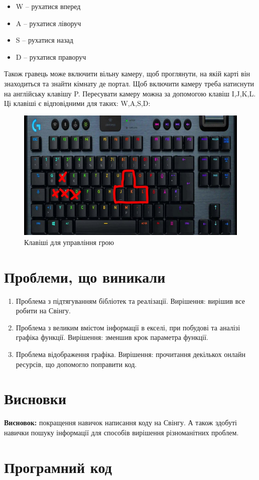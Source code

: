 \documentclass{article}
\begin{document}
\begin{itemize}
	\item W – рухатися вперед
	\item A – рухатися ліворуч
	\item S – рухатися назад
	\item D – рухатися праворуч
\end{itemize}
Також гравець може включити вільну камеру, щоб проглянути, на якій карті
він знаходиться та знайти кімнату де портал. Щоб включити камеру треба
натиснути на англійську клавішу P. Пересувати камеру можна за допомогою
клавіш I,J,K,L. Ці клавіші є відповідними для таких: W,A,S,D:
\begin{figure}[H]
	\centering
	\includegraphics[width=0.9 \textwidth]{4}
	\caption{Клавіші для управління грою}
\end{figure}
\section{Проблеми, що виникали}
\begin{enumerate}
	\item Проблема з підтягуванням бібліотек та реалізації. Вирішення: вирішив все робити на Свінгу.
	\item Проблема з великим вмістом інформації в екселі, при побудові та аналізі графіка функції. Вирішення: зменшив крок параметра функції.
	\item Проблема відображення графіка. Вирішення: прочитання декількох онлайн ресурсів, що допомогло поправити код.
\end{enumerate}
\section{Висновки}
\textbf{Висновок:} покращення навичок написання коду на Свінгу. А також
здобуті навички пошуку інформації для способів вирішення
різноманітних проблем.
\section*{Програмний код}

\listoffigures
\end{document}

